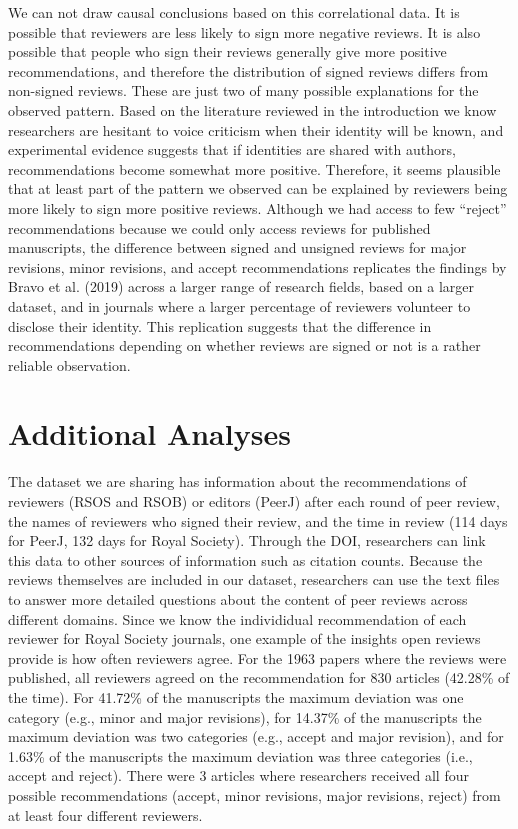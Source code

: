 \documentclass[,jou, a4paper,floatsintext]{apa6}
\begin{document}
We can not draw causal conclusions based on this correlational data. It is possible that reviewers are less likely to sign more negative reviews. It is also possible that people who sign their reviews generally give more positive recommendations, and therefore the distribution of signed reviews differs from non-signed reviews. These are just two of many possible explanations for the observed pattern. Based on the literature reviewed in the introduction we know researchers are hesitant to voice criticism when their identity will be known, and experimental evidence suggests that if identities are shared with authors, recommendations become somewhat more positive. Therefore, it seems plausible that at least part of the pattern we observed can be explained by reviewers being more likely to sign more positive reviews. Although we had access to few \enquote{reject} recommendations because we could only access reviews for published manuscripts, the difference between signed and unsigned reviews for major revisions, minor revisions, and accept recommendations replicates the findings by Bravo et al. (2019) across a larger range of research fields, based on a larger dataset, and in journals where a larger percentage of reviewers volunteer to disclose their identity. This replication suggests that the difference in recommendations depending on whether reviews are signed or not is a rather reliable observation.

\hypertarget{additional-analyses}{%
\section{Additional Analyses}\label{additional-analyses}}

The dataset we are sharing has information about the recommendations of reviewers (RSOS and RSOB) or editors (PeerJ) after each round of peer review, the names of reviewers who signed their review, and the time in review (114 days for PeerJ, 132 days for Royal Society). Through the DOI, researchers can link this data to other sources of information such as citation counts. Because the reviews themselves are included in our dataset, researchers can use the text files to answer more detailed questions about the content of peer reviews across different domains. Since we know the individidual recommendation of each reviewer for Royal Society journals, one example of the insights open reviews provide is how often reviewers agree. For the 1963 papers where the reviews were published, all reviewers agreed on the recommendation for 830 articles (42.28\% of the time). For 41.72\% of the manuscripts the maximum deviation was one category (e.g., minor and major revisions), for 14.37\% of the manuscripts the maximum deviation was two categories (e.g., accept and major revision), and for 1.63\% of the manuscripts the maximum deviation was three categories (i.e., accept and reject). There were 3 articles where researchers received all four possible recommendations (accept, minor revisions, major revisions, reject) from at least four different reviewers.
\end{document}
